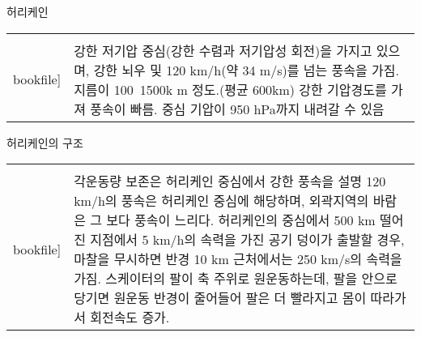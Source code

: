 \begin{frame}[t]{허리케인}
	\begin{tabular}{ll}
		\begin{minipage}[t]{0.45\textwidth}\scriptsize
			\begin{figure}[t]
				\texttt{[image: \\bookfile]}
			\end{figure}
		\end{minipage}	
		&
		\begin{minipage}[t]{0.5\textwidth} \scriptsize	
			강한 저기압 중심(강한 수렴과 저기압성 회전)을 가지고 있으며, 강한 뇌우 및     120 km/h(약 34 m/s)를 넘는 풍속을 가짐.
			지름이 100~1500k m 정도.(평균 600km)
			강한 기압경도를 가져 풍속이 빠름.
			중심 기압이 950 hPa까지 내려갈 수 있음
			
			
		\end{minipage}
	\end{tabular}
\end{frame}




\begin{frame}[t]{허리케인의 구조}
	\begin{tabular}{ll}
		\begin{minipage}[t]{0.45\textwidth}\scriptsize
			\begin{figure}[t]
				\texttt{[image: \\bookfile]}
			\end{figure}
		\end{minipage}	
		&
		\begin{minipage}[t]{0.5\textwidth} \scriptsize	
			각운동량 보존은 허리케인 중심에서 강한 풍속을 설명
			120 km/h의 풍속은 허리케인 중심에 해당하며, 외곽지역의 바람은 그 보다 풍속이 느리다. 
			허리케인의 중심에서 500 km 떨어진 지점에서 5 km/h의 속력을 가진 공기 덩이가 출발할 경우, 마찰을 무시하면 반경 10 km 근처에서는 250 km/s의 속력을 가짐.
			스케이터의 팔이 축 주위로 원운동하는데, 팔을 안으로 당기면 원운동 반경이 줄어들어 팔은 더 빨라지고 몸이 따라가서 회전속도 증가.
			
			
		\end{minipage}
	\end{tabular}
\end{frame}




